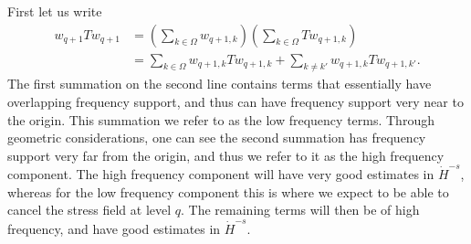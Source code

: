 \documentclass[12pt,reqno,letterpaper]{amsart}
\numberwithin{equation}{section}
\newcommand{\1}{{\bf 1}}
\newcommand{\2}{{\bf 2}}
\theoremstyle{remark}
\theoremstyle{remark}
\begin{document}
First let us write
\begin{equation}\label{eq:wTw_decomp_1}
    \begin{split}
        w_{q+1}Tw_{q+1} &= \left(\sum_{k \in \Omega} w_{q+1,k}\right)\left(\sum_{k\in \Omega} Tw_{q+1,k}\right)\\
        &= \sum_{k \in \Omega} w_{q+1,k}Tw_{q+1,k} + \sum_{k\not =k'} w_{q+1,k}Tw_{q+1,k'}.
    \end{split}
\end{equation}
The first summation on the second line contains terms that essentially have overlapping frequency support, and thus can have frequency support very near to the origin. This summation we refer to as the low frequency terms. Through geometric considerations, one can see the second summation has frequency support very far from the origin, and thus we refer to it as the high frequency component. The high frequency component will have very good estimates in $\dot{H}^{-s}$, whereas for the low frequency component this is where we expect to be able to cancel the stress field at level $q$. The remaining terms will then be of high frequency, and have good estimates in $\dot{H}^{-s}$.
\end{document}
